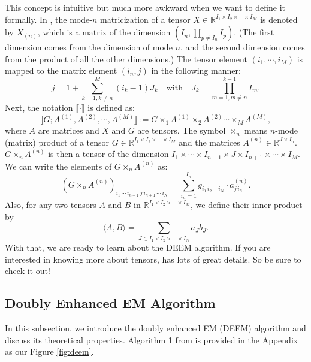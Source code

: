 \documentclass[11pt]{article}
\begin{document}
This concept is intuitive but much more awkward when we want to define it formally. In \cite{kolda2009review}, the mode-$n$ matricization of a tensor $X \in \mathbb{R}^{I_1 \times I_2 \times \cdots \times I_M}$ is denoted by $X_{(n)}$, which is a matrix of the dimension $(I_n, \prod_{p \ne I_n} I_p)$. (The first dimension comes from the dimension of mode $n$, and the second dimension comes from the product of all the other dimensions.) The tensor element $(i_1, \cdots, i_M)$ is mapped to the matrix element $(i_n, j)$ in the following manner: 
\begin{equation*}
    j = 1 + \sum_{k=1,k\ne n}^M (i_k - 1) J_k \quad \text{with} \quad J_k = \prod_{m=1,m \ne n}^{k-1} I_m.
\end{equation*}
Next, the notation $\llbracket \cdot \rrbracket$ is defined as: 
\begin{equation*}
    \llbracket G; A^{(1)}, A^{(2)}, \cdots, A^{(M)} \rrbracket := G \times_1 A^{(1)} \times_2 A^{(2)} 
    \cdots 
    \times_M A^{(M)},
\end{equation*}
where $A$ are matrices and $X$ and $G$ are tensors. The symbol $\times_n$ means $n$-mode (matrix) product of a tensor $G \in \mathbb{R}^{I_1 \times I_2 \times \cdots \times I_M}$ and the matrices $A^{(n)} \in \mathbb{R}^{J \times I_n}$. $G \times_n A^{(n)}$ is then a tensor of the dimension $I_1 \times \cdots \times I_{n-1} \times J \times I_{n+1} \times \cdots \times I_M$. We can write the elements of $G \times_n A^{(n)}$ as:
\begin{equation*}
    (G \times_n A^{(n)})_{i_1 \, \cdots \, i_{n-1} \, j  \, i_{n+1} \, \cdots \, i_N} = \sum_{i_n = 1}^{I_n} g_{i_1 \, i_2 \, \cdots \, i_N} \cdot a^{(n)}_{j\, i_n}.  
\end{equation*}
Also, for any two tensors $A$ and $B$ in $\mathbb{R}^{I_1 \times I_2 \times \cdots \times I_M}$, we define their inner product by
\begin{equation*}
    \langle A , B \rangle = \sum_{J\in I_1\times I_2 \times \cdots \times I_N} a_J b_J.
\end{equation*}
With that, we are ready to learn about the DEEM algorithm. If you are interested in knowing more about tensors, \cite{kolda2009review} has lots of great details. So be sure to check it out! 

\subsection{Doubly Enhanced EM Algorithm}
In this subsection, we introduce the doubly enhanced EM (DEEM) algorithm and discuss its theoretical properties. Algorithm 1 from \cite{mai2022DEEM} is provided in the Appendix as our Figure \ref{fig:deem}.
\end{document}
